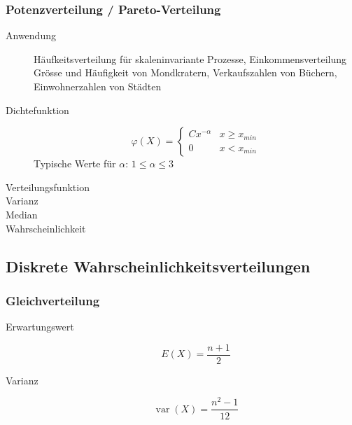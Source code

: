 
\subsubsection{Potenzverteilung / Pareto-Verteilung}
\begin{description}
  \item[Anwendung] Häufkeitsverteilung für skaleninvariante Prozesse,
    Einkommensverteilung Grösse und Häufigkeit von Mondkratern,
    Verkaufszahlen von Büchern, Einwohnerzahlen von Städten
  \item[Dichtefunktion] \[ \varphi(X) = \begin{cases} Cx^{-\alpha} & x \geq
    x_{min} \\ 0 & x < x_{min}\end{cases} \] Typische Werte für $\alpha$:
    $1 \leq \alpha \leq 3$
  \item[Verteilungsfunktion]
  \item[Varianz]
  \item[Median]
  \item[Wahrscheinlichkeit]
\end{description}

\subsection{Diskrete Wahrscheinlichkeitsverteilungen}
\subsubsection{Gleichverteilung}
\begin{description}
  \item[Erwartungswert] \[ E(X) = \frac{n+1}{2} \]
  \item[Varianz] \[ \operatorname{var}(X) = \frac{n^2-1}{12}\]
\end{description}

